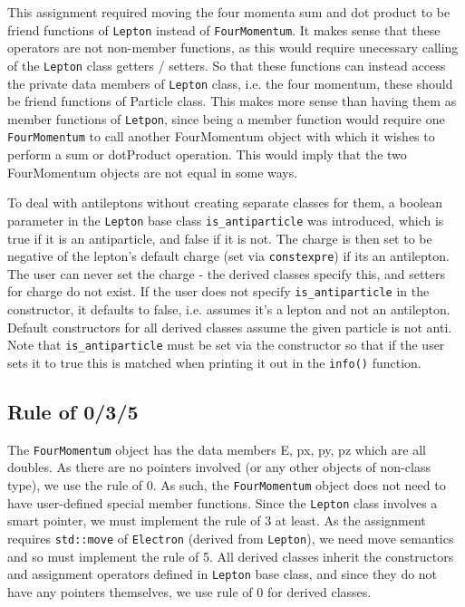\documentclass[11pt, letterpaper]{article}
\begin{document}
This assignment required moving the four momenta sum and dot product to be friend functions of \verb|Lepton| instead of \verb|FourMomentum|. It makes sense that these operators are not non-member functions, as this would require unecessary calling of the \verb|Lepton| class getters / setters. So that these functions can instead access the private data members of \verb|Lepton| class, i.e. the four momentum, these should be friend functions of Particle class. This makes more sense than having them as member functions of \verb|Letpon|, since being a member function would require one \verb|FourMomentum| to call another FourMomentum object with which it wishes to perform a sum or dotProduct operation. This would imply that the two FourMomentum objects are not equal in some ways.

To deal with antileptons without creating separate classes for them, a boolean parameter in the \verb|Lepton| base class \verb|is_antiparticle| was introduced, which is true if it is an antiparticle, and false if it is not. The charge is then set to be negative of the lepton's default charge (set via \verb|constexpre|) if its an antilepton. The user can never set the charge - the derived classes specify this, and setters for charge do not exist. If the user does not specify \verb|is_antiparticle| in the constructor, it defaults to false, i.e. assumes it's a lepton and not an antilepton. Default constructors for all derived classes assume the given particle is not anti. Note that \verb|is_antiparticle| must be set via the constructor so that if the user sets it to true this is matched when printing it out in the \verb|info()| function.


\subsection{Rule of 0/3/5}
The \verb|FourMomentum| object has the data members E, px, py, pz which are all doubles. As there are no pointers involved (or any other objects of non-class type), we use the rule of 0. As such, the \verb|FourMomentum| object does not need to have user-defined special member functions. Since the \verb|Lepton| class involves a smart pointer, we must implement the rule of 3 at least. As the assignment requires \verb|std::move| of \verb|Electron| (derived from \verb|Lepton|), we need move semantics and so must implement the rule of 5. All derived classes inherit the constructors and assignment operators defined in \verb|Lepton| base class, and since they do not have any pointers themselves, we use rule of 0 for derived classes.
\end{document}
